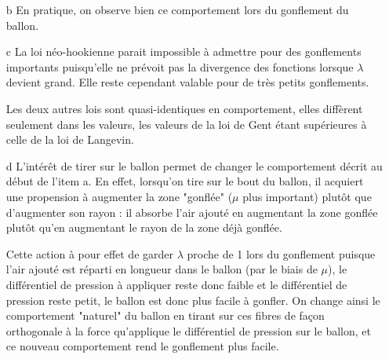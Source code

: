 \documentclass[a4paper,11pt]{article}
\begin{document}
\begin{enumerate}
\item[b]
En pratique, on observe bien ce comportement lors du gonflement du ballon.

\item[c]
La loi néo-hookienne parait impossible à admettre pour des gonflements importants puisqu'elle ne prévoit pas la divergence des fonctions lorsque $\lambda$ devient grand. Elle reste cependant valable pour de très petits gonflements.

\hspace{0.8cm}Les deux autres lois sont quasi-identiques en comportement, elles diffèrent seulement dans les valeurs, les valeurs de la loi de Gent étant supérieures à celle de la loi de Langevin.

\item[d]
L'intérêt de tirer sur le ballon permet de changer le comportement décrit au début de l'item a. En effet, lorsqu'on tire sur le bout du ballon, il acquiert une propension à augmenter la zone "gonflée" ($\mu$ plus important) plutôt que d'augmenter son rayon : il absorbe l'air ajouté en augmentant la zone gonflée plutôt qu'en augmentant le rayon de la zone déjà gonflée.

\hspace{0.8cm}Cette action à pour effet de garder $\lambda$ proche de 1 lors du gonflement puisque l'air ajouté est réparti en longueur dans le ballon (par le biais de $\mu$), le différentiel de pression à appliquer reste donc faible et le différentiel de pression reste petit, le ballon est donc plus facile à gonfler. On change ainsi le comportement "naturel" du ballon en tirant sur ces fibres de façon orthogonale à la force qu'applique le différentiel de pression sur le ballon, et ce nouveau comportement rend le gonflement plus facile.
\end{enumerate}
\end{document}
